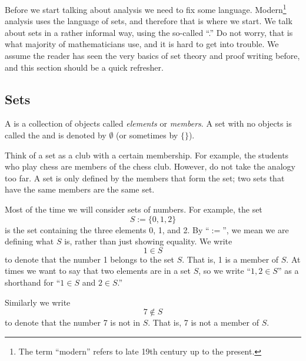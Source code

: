 
Before we start talking about analysis we need to fix some language.
Modern\footnote{The term ``modern'' refers to late 19th century up to
the present.}
analysis uses the language of sets, and therefore that is where we start.
We talk about sets in a rather informal way, using the so-called
``.''  Do not worry, that is what majority of
mathematicians use, and it is hard to get into trouble.
We assume the reader has seen the very basics of set theory
and proof writing before, and this section should be a quick refresher.

\subsection{Sets}

\begin{defn}
A \emph{} is a collection of objects called
\emph{elements} or \emph{members}.  A set with
no objects is called the \emph{} and is denoted by
$\emptyset$ (or sometimes by $\{ \}$).
\end{defn}

Think of a set as a club with a certain membership.  For
example, the students who play chess are members of the chess club.  However,
do not take the analogy too far.  A set is only defined by the members
that form the set; two sets that have the same members are the same set.

Most of the time we will consider sets
of numbers.  For example, the set
\begin{equation*}
S := \{ 0, 1, 2 \}
\end{equation*}
is the set containing
the three elements 0, 1, and 2.
By ``$:=$'', we mean we are defining what $S$ is, rather than
just showing equality.
We write
\begin{equation*}
1 \in S
\end{equation*}
to denote that the number 1 belongs to the set $S$.  That is, 1 is a member
of $S$.
At times we want to say that two elements are in a set $S$, so we 
write ``$1,2 \in S$'' as a shorthand for ``$1 \in S$ and $2 \in S$.''

Similarly we write
\begin{equation*}
7 \notin S
\end{equation*}
to denote that the number 7 is not in $S$.  That is, 7 is not a member of
$S$.

